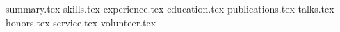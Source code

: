 \documentclass[11pt, a4paper,british]{awesome-cv}
\newcommand*{\sectiondir}{resume/}
\begin{document}
\makecvheader

{summary.tex}
{skills.tex}
{experience.tex}
{education.tex}
{publications.tex}
{talks.tex}
{honors.tex}
{service.tex}
{volunteer.tex}
\end{document}
